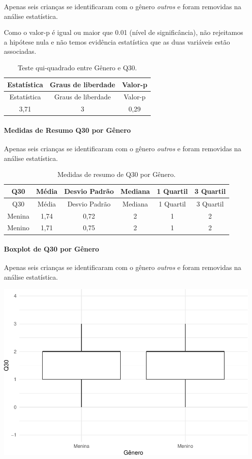 \documentclass[]{article}
\let\oldparagraph\paragraph
\renewcommand{\paragraph}[1]{\oldparagraph{#1}\mbox{}}
\begin{document}
Apenas seis crianças se identificaram com o gênero \emph{outros} e foram removidas na análise estatística.

Como o valor-p é igual ou maior que 0.01 (nível de significância), não rejeitamos a hipótese nula e não temos evidência estatística que as duas variáveis estão associadas.

\begin{longtable}[]{@{}ccc@{}}
\caption{\label{tab:unnamed-chunk-969}Teste qui-quadrado entre Gênero e Q30.}\tabularnewline
\toprule
Estatística & Graus de liberdade & Valor-p\tabularnewline
\midrule
\endfirsthead
\toprule
Estatística & Graus de liberdade & Valor-p\tabularnewline
\midrule
\endhead
3,71 & 3 & 0,29\tabularnewline
\bottomrule
\end{longtable}

\cleardoublepage

\hypertarget{medidas-de-resumo-q30-por-guxeanero}{%
\paragraph{Medidas de Resumo Q30 por Gênero}\label{medidas-de-resumo-q30-por-guxeanero}}

Apenas seis crianças se identificaram com o gênero \emph{outros} e foram removidas na análise estatística.

\begin{longtable}[]{@{}cccccc@{}}
\caption{\label{tab:unnamed-chunk-970}Medidas de resumo de Q30 por Gênero.}\tabularnewline
\toprule
Q30 & Média & Desvio Padrão & Mediana & 1 Quartil & 3 Quartil\tabularnewline
\midrule
\endfirsthead
\toprule
Q30 & Média & Desvio Padrão & Mediana & 1 Quartil & 3 Quartil\tabularnewline
\midrule
\endhead
Menina & 1,74 & 0,72 & 2 & 1 & 2\tabularnewline
Menino & 1,71 & 0,75 & 2 & 1 & 2\tabularnewline
\bottomrule
\end{longtable}

\hypertarget{boxplot-de-q30-por-guxeanero}{%
\paragraph{Boxplot de Q30 por Gênero}\label{boxplot-de-q30-por-guxeanero}}

Apenas seis crianças se identificaram com o gênero \emph{outros} e foram removidas na análise estatística.

\begin{center}\includegraphics[width=0.75\linewidth]{relatorio_covid19_files/figure-latex/unnamed-chunk-971-1} \end{center}
\end{document}
